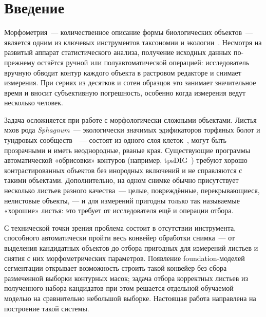 
\section*{Введение}
\thispagestyle{withCompileDate}

Морфометрия~--- количественное описание формы биологических объектов~--- является одним
из ключевых инструментов таксономии и экологии~\cite{Bookstein1991,DrydenMardia1998}.
Несмотря на развитый аппарат статистического анализа, получение исходных данных по-прежнему
остаётся ручной или полуавтоматической операцией: исследователь вручную обводит контур
каждого объекта в растровом редакторе и снимает измерения.
При сериях из десятков и сотен образцов это занимает значительное время и вносит
субъективную погрешность, особенно когда измерения ведут несколько человек.

Задача осложняется при работе с морфологически сложными объектами.
Листья мхов рода \textit{Sphagnum}~--- экологически значимых эдификаторов торфяных болот
и тундровых сообществ~\cite{ClymoHayward1982,Rydin2006}~--- состоят из одного слоя
клеток~\cite{DanielsEddy1985,IvanovIgnatov2011}, могут быть прозрачными и иметь неоднородные,
рваные края.
Существующие программы автоматической «обрисовки» контуров (например, tpsDIG~\cite{Rohlf2021})
требуют хорошо контрастированных объектов без инородных включений и не справляются с такими
объектами. Дополнительно, на одном снимке обычно присутствует несколько листьев разного
качества~--- целые, повреждённые, перекрывающиеся, нелистовые объекты, --- и для измерений
пригодны только так называемые «хорошие» листья: это требует от исследователя ещё и
операции отбора.

С технической точки зрения проблема состоит в отсутствии инструмента, способного
автоматически пройти весь конвейер обработки снимка~--- от выделения кандидатных объектов
до отбора пригодных для измерений листьев и снятия с них морфометрических параметров.
Появление foundation-моделей сегментации открывает
возможность строить такой конвейер без сбора размеченной выборки контурных масок;
задача отбора корректных листьев из полученного набора кандидатов при этом решается
отдельной обучаемой моделью на сравнительно небольшой выборке. Настоящая работа
направлена на построение такой системы.

